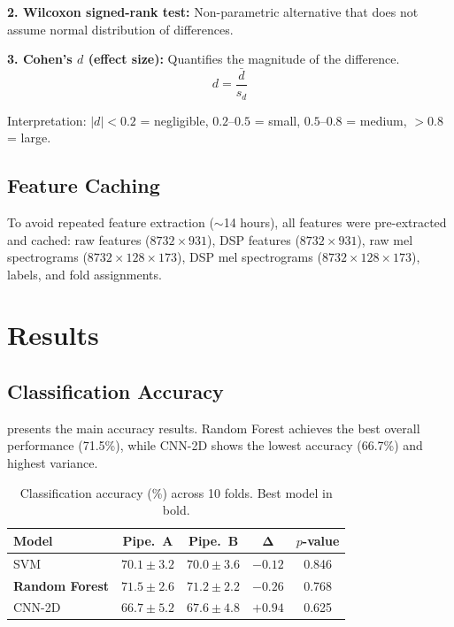 \documentclass[conference]{IEEEtran}
\begin{document}
\textbf{2. Wilcoxon signed-rank test:} Non-parametric alternative that does not assume normal distribution of differences.

\textbf{3. Cohen's $d$ (effect size):} Quantifies the magnitude of the difference.
\begin{equation}
    d = \frac{\bar{d}}{s_d}
    \label{eq:cohens_d}
\end{equation}

Interpretation: $|d| < 0.2$ = negligible, $0.2$--$0.5$ = small, $0.5$--$0.8$ = medium, $> 0.8$ = large.

\subsection{Feature Caching}

To avoid repeated feature extraction ($\sim$14 hours), all features were pre-extracted and cached: raw features ($8732 \times 931$), DSP features ($8732 \times 931$), raw mel spectrograms ($8732 \times 128 \times 173$), DSP mel spectrograms ($8732 \times 128 \times 173$), labels, and fold assignments.

\section{Results}
\label{sec:results}

\subsection{Classification Accuracy}

 presents the main accuracy results. Random Forest achieves the best overall performance (71.5\%), while CNN-2D shows the lowest accuracy (66.7\%) and highest variance.

\begin{table}[htbp]
\centering
\caption{Classification accuracy (\%) across 10 folds. Best model in bold.}
\label{tab:accuracy}
\begin{tabular}{@{}lcccc@{}}
\toprule
\textbf{Model} & \textbf{Pipe.\ A} & \textbf{Pipe.\ B} & $\boldsymbol{\Delta}$ & \textbf{$p$-value} \\
\midrule
SVM            & $70.1 \pm 3.2$ & $70.0 \pm 3.6$ & $-0.12$ & 0.846 \\
\textbf{Random Forest} & $\mathbf{71.5 \pm 2.6}$ & $71.2 \pm 2.2$ & $-0.26$ & 0.768 \\
CNN-2D         & $66.7 \pm 5.2$ & $67.6 \pm 4.8$ & $+0.94$ & 0.625 \\
\bottomrule
\end{tabular}
\end{table}
\end{document}
